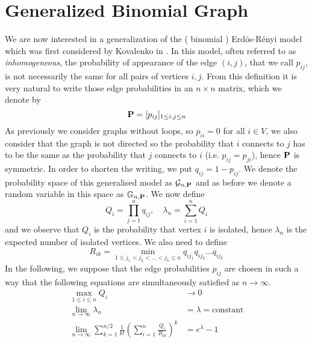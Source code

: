 \section{Generalized Binomial Graph}
We are now interested in a generalization of the ( binomial ) Erd\"os-R\'enyi model which was first considered by Kovalenko in \cite{Kovalenko71}.
In this model, often referred to as \emph{inhomogeneous}, the probability of appearance of the edge $(i,j)$, that we call $p_{ij}$, is not necessarily the same for all pairs of vertices $i,j$.
\newline
From this definition it is very natural to write those edge probabilities in an $n\times n$ matrix, which we denote by
\begin{equation}
	\bold{P} = [p_{ij}]_{1\leq i,j \leq n}
\end{equation}
As previously we consider graphs without loops, so $p_{ii} = 0$ for all $i \in V$, we also consider that the graph is not directed so the probability that $i$ connects to $j$ has to be the same as the probability that $j$ connects to $i$ (i.e. $p_{ij} = p_{ji}$), hence $\bold{P}$ is symmetric.
In order to shorten the writing, we put $q_{ij} = 1 - p_{ij}$.
\newline
We denote the probability space of this generalised model as $\mathcal{G}_{n,\bold{P}}$ and as before we denote a random variable in this space as $\mathbb{G}_{n,\bold{P}}$.
\newline
We now define
\begin{equation}
	Q_i = \prod_{j=1}^n q_{ij}, \quad \lambda_n = \sum_{i=1}^nQ_i
\end{equation}
and we observe that $Q_i$ is the probability that vertex $i$ is isolated, hence $\lambda_n$ is the expected number of isolated vertices.
\newline
We also need to define
\begin{equation}
	R_{ik} = \min_{1\leq j_1<j_2< \ldots <j_k\leq n} q_{ij_1}q_{ij_2}\ldots q_{ij_k}
\end{equation}
In the following, we suppose that the edge probabilities $p_{ij}$ are chosen in such a way that the following equations are simultaneously satisfied as $n\to \infty$.
\begin{align}
	\max_{1\leq i \leq n} Q_i &\to 0 \label{eq:C1}\\
	\lim_{n \to \infty} \lambda_n &= \lambda = \text{constant} \label{eq:C2} \\
	\lim_{n\to \infty} \sum_{k=1}^{n/2} \frac{1}{k!}(\sum_{i=1}^n \frac{Q_i}{R_{ik}})^k &= e^{\lambda} - 1 \label{eq:C3}
\end{align}
